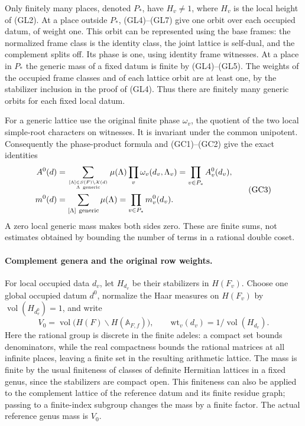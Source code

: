 Only finitely many places, denoted \(P_*\), have \(H_v\ne1\),
where \(H_v\) is the local height of (GL2). At a place outside
\(P_*\), (GL4)--(GL7) give one orbit over each occupied datum, of
weight one. This orbit can be represented using the base frames:
the normalized frame class is the identity class, the joint
lattice is self-dual, and the complement splits off. Its phase
is one, using identity frame witnesses. At a place in \(P_*\)
the generic mass of a fixed datum is finite by (GL4)--(GL5).
The weights of the occupied frame classes and of each lattice
orbit are at least one, by the stabilizer inclusion in the proof
of (GL4). Thus there are finitely many generic orbits for each
fixed local datum.

For a generic lattice use the original finite phase
\(\omega_v\), the quotient of the two local simple-root
characters on witnesses. It is invariant under the common
unipotent. Consequently the phase-product formula and (GC1)--(GC2)
give the exact identities
\[
 \begin{split}
 A^0(d)&=\sum_{[\Lambda]\in S(F)\backslash\mathcal X(d)
                              \atop \Lambda\ {\rm generic}}
               \mu(\Lambda)\prod_v\omega_v(d_v,\Lambda_v)
                =\prod_{v\in P_*} A_v^0(d_v),\\
 m^0(d)&=\sum_{[\Lambda]\ {\rm generic}}\mu(\Lambda)
                =\prod_{v\in P_*}m_v^0(d_v).
 \end{split} \tag{GC3}
\]
A zero local generic mass makes both sides zero. These are
finite sums, not estimates obtained by bounding the number of
terms in a rational double coset.

\paragraph{Complement genera and the original row weights.}
For local occupied data \(d_v\), let \(H_{d_v}\) be their
stabilizers in \(H(F_v)\). Choose one global occupied datum
\(d^0\), normalize the Haar measures on \(H(F_v)\) by
\(\operatorname{vol}(H_{d_v^0})=1\), and write
\[
 V_0=\operatorname{vol}\bigl(H(F)\backslash H(\mathbb A_{F,f})\bigr),
 \qquad \mathrm{wt}_v(d_v)=1/\operatorname{vol}(H_{d_v}).
\]
Here the rational group is discrete in the finite adeles: a
compact set bounds denominators, while the real compactness
bounds the rational matrices at all infinite places, leaving a
finite set in the resulting arithmetic lattice. The mass is
finite by the usual finiteness of classes of definite Hermitian
lattices in a fixed genus, since the stabilizers are compact
open. This finiteness can also be applied to the complement
lattice of the reference datum and its finite residue graph;
passing to a finite-index subgroup changes the mass by a
finite factor. The actual reference genus mass is \(V_0\).

